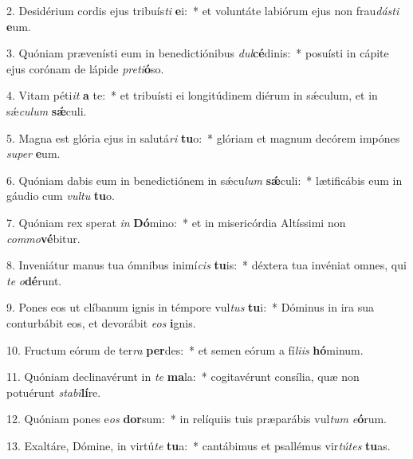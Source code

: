 2. Desidérium cordis ejus tribuís\textit{ti} \textbf{e}i:~*  et voluntáte labiórum ejus non frau\textit{dás}\textit{ti} \textbf{e}um.\

3. Quóniam prævenísti eum in benedictiónibus \textit{dul}\textbf{cé}dinis:~*  posuísti in cápite ejus corónam de lápide \textit{pre}\textit{ti}\textbf{ó}so.\

4. Vitam péti\textit{it} \textbf{a} te:~*  et tribuísti ei longitúdinem diérum in sǽculum, et in sǽ\textit{cu}\textit{lum} \textbf{sǽ}culi.\

5. Magna est glória ejus in salutá\textit{ri} \textbf{tu}o:~*  glóriam et magnum decórem impónes \textit{su}\textit{per} \textbf{e}um.\

6. Quóniam dabis eum in benedictiónem in sǽcu\textit{lum} \textbf{sǽ}culi:~*  lætificábis eum in gáudio cum \textit{vul}\textit{tu} \textbf{tu}o.\

7. Quóniam rex sperat \textit{in} \textbf{Dó}mino:~*  et in misericórdia Altíssimi non \textit{com}\textit{mo}\textbf{vé}bitur.\

8. Inveniátur manus tua ómnibus inimí\textit{cis} \textbf{tu}is:~*  déxtera tua invéniat omnes, qui \textit{te} \textit{o}\textbf{dé}runt.\

9. Pones eos ut clíbanum ignis in témpore vul\textit{tus} \textbf{tu}i:~*  Dóminus in ira sua conturbábit eos, et devorábit \textit{e}\textit{os} \textbf{i}gnis.\

10. Fructum eórum de ter\textit{ra} \textbf{per}des:~*  et semen eórum a fí\textit{li}\textit{is} \textbf{hó}minum.\

11. Quóniam declinavérunt in \textit{te} \textbf{ma}la:~*  cogitavérunt consília, quæ non potuérunt \textit{sta}\textit{bi}\textbf{lí}re.\

12. Quóniam pones e\textit{os} \textbf{dor}sum:~*  in relíquiis tuis præparábis vul\textit{tum} \textit{e}\textbf{ó}rum.\

13. Exaltáre, Dómine, in virtú\textit{te} \textbf{tu}a:~*  cantábimus et psallémus vir\textit{tú}\textit{tes} \textbf{tu}as.\

